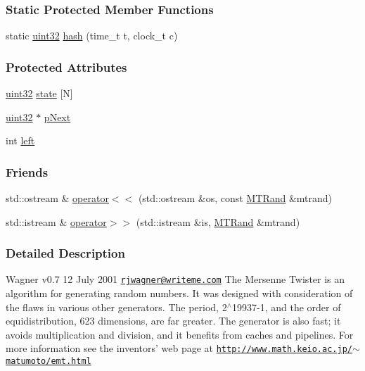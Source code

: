 \subsubsection*{Static Protected Member Functions}
\begin{DoxyCompactItemize}
\item 
static \hyperlink{class_m_t_rand_a45478edf9e24dcd2a5164bac3889d6a2}{uint32} \hyperlink{class_m_t_rand_a486885d03f38c844315d002e6312fa23}{hash} (time\_\-t t, clock\_\-t c)
\end{DoxyCompactItemize}
\subsubsection*{Protected Attributes}
\begin{DoxyCompactItemize}
\item 
\hyperlink{class_m_t_rand_a45478edf9e24dcd2a5164bac3889d6a2}{uint32} \hyperlink{class_m_t_rand_a2c87f537429bf0b0f6a452c22b9eebba}{state} \mbox{[}N\mbox{]}
\item 
\hyperlink{class_m_t_rand_a45478edf9e24dcd2a5164bac3889d6a2}{uint32} $\ast$ \hyperlink{class_m_t_rand_a2b80858137c88fe69d4d2bdc665bcf93}{pNext}
\item 
int \hyperlink{class_m_t_rand_a98eabf568c88f121e44f487397f32495}{left}
\end{DoxyCompactItemize}
\subsubsection*{Friends}
\begin{DoxyCompactItemize}
\item 
std::ostream \& \hyperlink{class_m_t_rand_a059061d50a1e54ee3067d4e1dbdd7c64}{operator$<$$<$} (std::ostream \&os, const \hyperlink{class_m_t_rand}{MTRand} \&mtrand)
\item 
std::istream \& \hyperlink{class_m_t_rand_a45b02a702835a3be42171c5c2dc79b2d}{operator$>$$>$} (std::istream \&is, \hyperlink{class_m_t_rand}{MTRand} \&mtrand)
\end{DoxyCompactItemize}


\subsubsection{Detailed Description}
Wagner v0.7 12 July 2001 \href{mailto:rjwagner@writeme.com}{\tt rjwagner@writeme.com} The Mersenne Twister is an algorithm for generating random numbers. It was designed with consideration of the flaws in various other generators. The period, 2$^\wedge$19937-\/1, and the order of equidistribution, 623 dimensions, are far greater. The generator is also fast; it avoids multiplication and division, and it benefits from caches and pipelines. For more information see the inventors' web page at \href{http://www.math.keio.ac.jp/~matumoto/emt.html}{\tt http://www.math.keio.ac.jp/$\sim$matumoto/emt.html}

